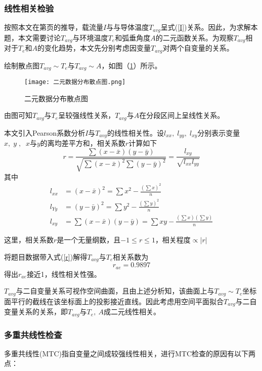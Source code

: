 \documentclass[withoutpreface,bwprint]{cumcmthesis}  %
\begin{document}
	\subsubsection{线性相关检验}
	按照本文在第\pageref{I}页的推导，载流量$I$与与导体温度$T_{avg}$呈式(\ref{I})关系。因此，为求解本题，本文需要讨论$T_{avg}$与环境温度$T_{e}$和弧垂角度$A$的二元函数关系。为观察$T_{avg}$相对于$T_{e}$和$A$的变化趋势，本文先分别考虑因变量$T_{avg}$对两个自变量的关系。

        绘制散点图$T_{avg}\sim T_{e}$与$T_{avg}\sim A$，如图（\ref{ggnld}）所示。
	\begin{figure}[H]
		\centering
		\texttt{[image: 二元数据分布散点图.png]}
		\caption{二元数据分布散点图}  %
		\label{ggnld}     %
	\end{figure}
        由图可知$T_{avg}$与$T_{e}$呈较强线性关系，$T_{avg}$与$A$在分段区间上呈线性关系。
        
        本文引入Pearson系数分析$I$与$T_{avg}$的线性相关性。设$l_{x x},\;l_{y y},\;l_{x y}$分别表示变量$x,\;y\;,\;\;x$与$y$的离均差平方和，相关系数$r$计算如下
	\begin{equation}\label{r}
		r=\frac{\sum(x-\bar{x})(y-\bar{y})}{\sqrt{\sum(x-\bar{x})^{2} \sum(y-\bar{y})^{2}}}=\frac{l_{x y}}{\sqrt{l_{x x} l_{y y}}}
	\end{equation}
         其中
	\begin{align}
		l_{x x}&=(x-\bar{x})^{2}=\sum x^{2}-\frac{\left(\sum x\right)^{2}}{n} \\
        l_{Y y}&=(y-\bar{y})^{2}=\sum y^{2}-\frac{\left(\sum y\right)^{2}}{n} \\
        l_{x y}&=\sum(x-\bar{x})(y-\bar{y})=\sum x y-\frac{\left(\sum x\right)\left(\sum y\right)}{n}
	\end{align}

        这里，相关系数$r$是一个无量纲数，且$-1 \leq r \leq 1$，相关程度$\propto\left|r\right | $
        
        将题目数据带入式(\ref{r})解得$T_{avg}$与$T_{e}$相关系数为
        \[
		r_{ae}=0.9897
	\]
        得出$r_{ae}$接近1，线性相关性强。

        $T_{avg}$与二自变量关系可视作空间曲面，且由上述分析知，该曲面上与$T_{avg}\sim T_{e}$坐标面平行的截线在该坐标面上的投影接近直线。因此考虑用空间平面拟合$T_{avg}$与二自变量关系的关系，即$T_{avg}$与$T_{e},\:A$成二元线性相关。
	\subsubsection{多重共线性检查}
	多重共线性(MTC)指自变量之间成较强线性相关，进行MTC检查的原因有以下两点：
\end{document}
